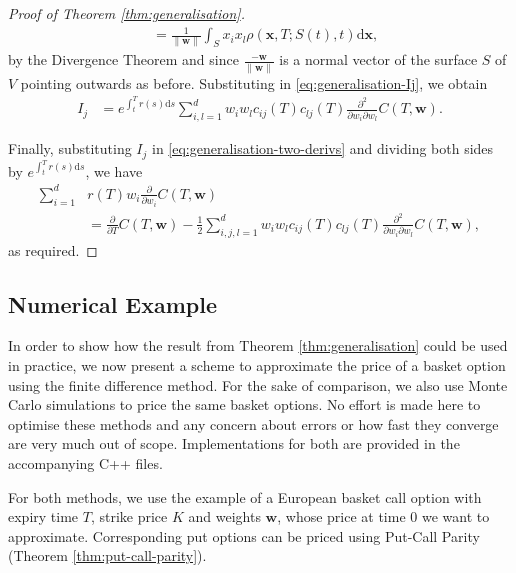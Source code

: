 \documentclass[english]{article}
\numberwithin{equation}{section}
\numberwithin{figure}{section}
\theoremstyle{bolddescit}
\theoremstyle{definition}
\theoremstyle{definition}
\theoremstyle{plain}
\theoremstyle{plain}
\theoremstyle{bolddesc}
\theoremstyle{plain}
\theoremstyle{remark}
\begin{document}
\begin{proof}[Proof of Theorem \ref{thm:generalisation}]
\begin{align*}
    &= \frac{1}{\|\mathbf{w}\|} \int_S x_i x_l \rho(\mathbf{x},T;S(t),t) \mathrm{d}\mathbf{x},
  \end{align*}
  by the Divergence Theorem and since $\frac{-\mathbf{w}}{\|\mathbf{w}\|}$ is a normal vector of the surface $S$ of $V$ pointing outwards as before. Substituting in \eqref{eq:generalisation-Ij}, we obtain
  \begin{align*}
    I_j
    &= e^{\int_t^T r(s) \mathrm{d}s} \sum_{i,l=1}^{d} w_i w_l c_{ij}(T) c_{lj}(T) \frac{\partial^2}{\partial w_i \partial w_l} C(T,\mathbf{w}).
  \end{align*}

  Finally, substituting $I_j$ in \eqref{eq:generalisation-two-derivs} and dividing both sides by $e^{\int_t^T r(s) \mathrm{d}s}$, we have
  \begin{align*}
    \sum_{i=1}^{d} &r(T) w_i \frac{\partial}{\partial w_i} C(T,\mathbf{w})\\
    &= \frac{\partial}{\partial T} C(T,\mathbf{w}) - \frac{1}{2} \sum_{i,j,l=1}^{d} w_i w_l c_{ij}(T) c_{lj}(T) \frac{\partial^2}{\partial w_i \partial w_l} C(T,\mathbf{w}),
  \end{align*}
  as required.
\end{proof}

\subsection{Numerical Example}


In order to show how the result from Theorem \ref{thm:generalisation} could be used in practice, we now present a scheme to approximate the price of a basket option using the finite difference method. For the sake of comparison, we also use Monte Carlo simulations to price the same basket options. No effort is made here to optimise these methods and any concern about errors or how fast they converge are very much out of scope. Implementations for both are provided in the accompanying C++ files.

For both methods, we use the example of a European basket call option with expiry time $T$, strike price $K$ and weights $\mathbf{w}$, whose price at time 0 we want to approximate. Corresponding put options can be priced using Put-Call Parity (Theorem \ref{thm:put-call-parity}).
\end{document}
